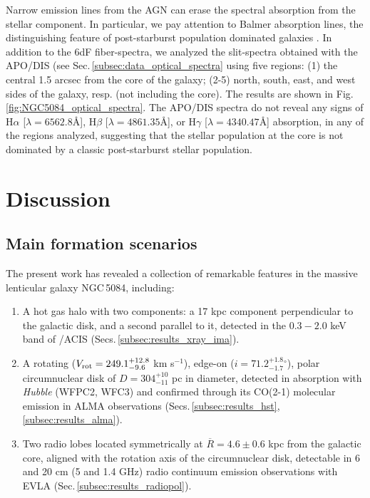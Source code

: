 \documentclass[modern]{aastex631}
\begin{document}
Narrow emission lines from the AGN can erase the spectral absorption from the stellar component. In particular, we pay attention to Balmer absorption lines, the distinguishing feature of post-starburst population dominated galaxies \citep[also called E+A or K+A galaxies,][]{dressler+1983apj270_7}. In addition to the 6dF fiber-spectra, we analyzed the slit-spectra obtained with the APO/DIS 
(see Sec.\,\ref{subsec:data_optical_spectra}
using five regions: (1) the central 1.5 arcsec from the core of the galaxy; (2-5) north, south, east, and west sides of the galaxy, resp. (not including the core). The results are shown in Fig.\,\ref{fig:NGC5084_optical_spectra}. The APO/DIS spectra do not reveal any signs of H$\alpha$ [$\lambda=6562.8$\AA], H$\beta$ [$\lambda=4861.35$\AA], or H$\gamma$ [$\lambda=4340.47$\AA] absorption, in any of the regions analyzed, suggesting that the stellar population at the core is not dominated by a classic post-starburst stellar population. 


\section{Discussion} 
\label{sec:DIS}

\subsection{Main formation scenarios}
\label{subsec:discussion_main_formation_scenarios}
The present work has revealed a collection of remarkable features in the massive lenticular galaxy NGC\,5084, including: 
\begin{enumerate}

    \item A hot gas halo with two components: a 17 kpc component perpendicular to the galactic disk, and a second parallel to it, detected in the $0.3-2.0$ keV band of \Chandra/ACIS (Secs.\,\ref{subsec:results_xray_ima}). 

    \item A rotating ($V_{\rm rot} = 249.1^{+12.8}_{-9.6}$ km s$^{-1}$), edge-on ($i=71.2^{+1.8}_{-1.7}$$^{\circ}$), polar circumnuclear disk of $D=304^{+10}_{-11}$ pc in diameter, detected in absorption with \emph{Hubble} (WFPC2, WFC3) and confirmed through its CO(2-1) molecular emission in ALMA  observations (Secs.\,\ref{subsec:results_hst}, \,\ref{subsec:results_alma}).
    
    \item Two radio lobes located symmetrically at $\overline{R}=4.6\pm0.6$ kpc from the galactic core, aligned with the rotation axis of the circumnuclear disk, detectable in 6 and 20 cm (5 and 1.4 GHz) radio continuum emission observations with EVLA (Sec.\,\ref{subsec:results_radiopol}).  
    
    
\end{enumerate}
\end{document}
